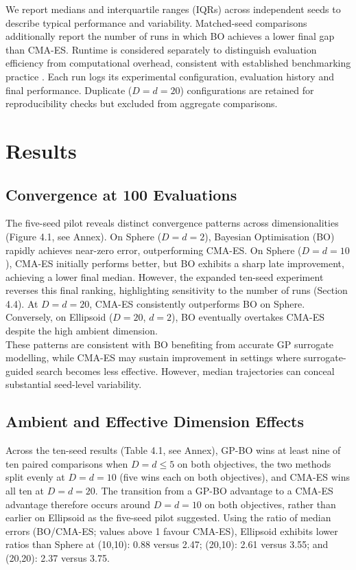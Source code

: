 \documentclass[11pt]{article}
\begin{document}
\noindent We report medians and interquartile ranges (IQRs) across independent seeds to describe typical performance and variability. Matched-seed comparisons additionally report the number of runs in which BO achieves a lower final gap than CMA-ES. Runtime is considered separately to distinguish evaluation efficiency from computational overhead, consistent with established benchmarking practice \citep{hansen2023cma, santoni2024comparison}. Each run logs its experimental configuration, evaluation history and final performance. Duplicate ($D=d=20$) configurations are retained for reproducibility checks but excluded from aggregate comparisons.

\section{Results}

\subsection{Convergence at 100 Evaluations}
\noindent The five-seed pilot reveals distinct convergence patterns across dimensionalities (Figure 4.1, see Annex). On Sphere ($D=d=2$), Bayesian Optimisation (BO) rapidly achieves near-zero error, outperforming CMA-ES. On Sphere ($D=d=10$), CMA-ES initially performs better, but BO exhibits a sharp late improvement, achieving a lower final median. However, the expanded ten-seed experiment reverses this final ranking, highlighting sensitivity to the number of runs (Section 4.4). At $D=d=20$, CMA-ES consistently outperforms BO on Sphere. Conversely, on Ellipsoid ($D=20$, $d=2$), BO eventually overtakes CMA-ES despite the high ambient dimension.\\

\noindent These patterns are consistent with BO benefiting from accurate GP surrogate modelling, while CMA-ES may sustain improvement in settings where surrogate-guided search becomes less effective. However, median trajectories can conceal substantial seed-level variability.


\subsection{Ambient and Effective Dimension Effects}
\noindent Across the ten-seed results (Table 4.1, see Annex), GP-BO wins at least nine of ten paired comparisons when $D = d \leq 5$ on both objectives, the two methods split evenly at $D = d = 10$ (five wins each on both objectives), and CMA-ES wins all ten at $D = d = 20$. The transition from a GP-BO advantage to a CMA-ES advantage therefore occurs around $D=d=10$ on both objectives, rather than earlier on Ellipsoid as the five-seed pilot suggested. Using the ratio of median errors (BO/CMA-ES; values above 1 favour CMA-ES), Ellipsoid exhibits lower ratios than Sphere at (10,10): 0.88 versus 2.47; (20,10): 2.61 versus 3.55; and (20,20): 2.37 versus 3.75.\\
\end{document}

